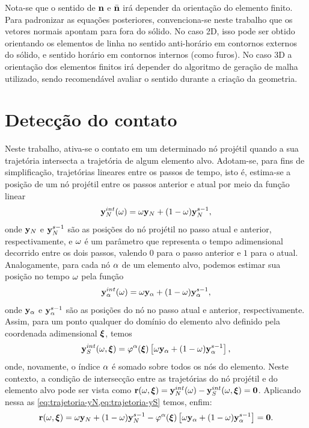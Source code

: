 \documentclass[Tese.tex]{subfiles}
\begin{document}
Nota-se que o sentido de $\mathbf{n}$ e $\bar{\mathbf{n}}$ irá depender da orientação do elemento finito. Para padronizar as equações posteriores, convenciona-se neste trabalho que os vetores normais apontam para fora do sólido. No caso 2D, isso pode ser obtido orientando os elementos de linha no sentido anti-horário em contornos externos do sólido, e sentido horário em contornos internos (como furos). No caso 3D a orientação dos elementos finitos irá depender do algoritmo de geração de malha utilizado, sendo recomendável avaliar o sentido durante a criação da geometria.

\section{Detecção do contato}

Neste trabalho, ativa-se o contato em um determinado nó projétil quando a sua trajetória intersecta a trajetória de algum elemento alvo. Adotam-se, para fins de simplificação, trajetórias lineares entre os passos de tempo, isto é, estima-se a posição de um nó projétil entre os passos anterior e atual por meio da função linear
\begin{equation}\label{eq:trajetoria-yN}
\mathbf{y}_N^{int}(\omega) = \omega\mathbf{y}_N + (1-\omega)\mathbf{y}_N^{s-1},
\end{equation}
onde $\mathbf{y}_N$ e $\mathbf{y}_N^{s-1}$ são as posições do nó projétil no passo atual e anterior, respectivamente, e $\omega$ é um parâmetro que representa o tempo adimensional decorrido entre os dois passos, valendo $0$ para o passo anterior e $1$ para o atual. Analogamente, para cada nó $\alpha$ de um elemento alvo, podemos estimar sua posição no tempo $\omega$ pela função
\begin{equation}
\mathbf{y}_\alpha^{int}(\omega) = \omega\mathbf{y}_\alpha + (1-\omega)\mathbf{y}_\alpha^{s-1},
\end{equation}
onde $\mathbf{y}_\alpha$ e $\mathbf{y}_\alpha^{s-1}$ são as posições do nó no passo atual e anterior, respectivamente. Assim, para um ponto qualquer do domínio do elemento alvo definido pela coordenada adimensional $\boldsymbol{\xi}$, temos
\begin{equation}\label{eq:trajetoria-yS}
\mathbf{y}_S^{int}(\omega,\boldsymbol{\xi}) = \varphi^\alpha(\boldsymbol{\xi})\left[\omega\mathbf{y}_\alpha + (1-\omega)\mathbf{y}_\alpha^{s-1}\right],
\end{equation}
onde, novamente, o índice $\alpha$ é somado sobre todos os nós do elemento. Neste contexto, a condição de intersecção entre as trajetórias do nó projétil e do elemento alvo pode ser vista como $\mathbf{r}(\omega,\boldsymbol{\xi}) = \mathbf{y}_N^{int}(\omega) - \mathbf{y}_S^{int}(\omega,\boldsymbol{\xi}) = \mathbf{0}$. Aplicando nessa as \cref{eq:trajetoria-yN,eq:trajetoria-yS} temos, enfim:
\begin{equation}\label{eq:interseccao}
\mathbf{r}(\omega,\boldsymbol{\xi}) = \omega\mathbf{y}_N + (1-\omega)\mathbf{y}_N^{s-1} - \varphi^\alpha(\boldsymbol{\xi})\left[\omega\mathbf{y}_\alpha + (1-\omega)\mathbf{y}_\alpha^{s-1}\right] = \mathbf{0}.
\end{equation}
\end{document}
